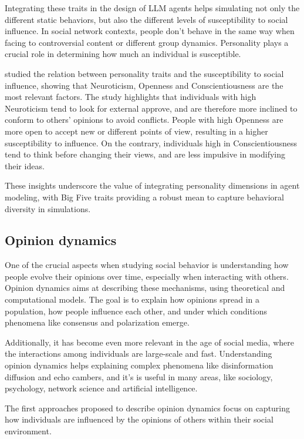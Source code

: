 \medskip
Integrating these traits in the design of LLM agents helps simulating not only the different static behaviors, but also the different levels of susceptibility to social influence.
In social network contexts, people don't behave in the same way when facing to controversial content or different group dynamics.
Personality plays a crucial role in determining how much an individual is susceptible.

\medskip
\citet{oyibo2019personality} studied the relation between personality traits and the susceptibility to social influence, showing that Neuroticism, Openness and Conscientiousness are the most relevant factors.
The study highlights that individuals with high Neuroticism tend to look for external approve, and are therefore more inclined to conform to others' opinions to avoid conflicts.
People with high Openness are more open to accept new or different points of view, resulting in a higher susceptibility to influence.
On the contrary, individuals high in Conscientiousness tend to think before changing their views, and are less impulsive in modifying their ideas.

\medskip
These insights underscore the value of integrating personality dimensions in agent modeling, with Big Five traits providing a robust mean to capture behavioral diversity in simulations.




\subsection{Opinion dynamics}
One of the crucial aspects when studying social behavior is understanding how people evolve their opinions over time, especially when interacting with others.
Opinion dynamics aims at describing these mechanisms, using theoretical and computational models.
The goal is to explain how opinions spread in a population, how people influence each other, and under which conditions phenomena like consensus and polarization emerge.

Additionally, it has become even more relevant in the age of social media, where the interactions among individuals are large-scale and fast.
Understanding opinion dynamics helps explaining complex phenomena like disinformation diffusion and echo cambers, and it's is useful in many areas, like sociology, psychology, network science and artificial intelligence.


\medskip
The first approaches proposed to describe opinion dynamics focus on capturing how individuals are influenced by the opinions of others within their social environment.

